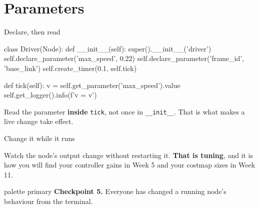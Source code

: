 \documentclass[aspectratio=169]{beamer}
\begin{document}
\section{Parameters}

\begin{frame}[fragile]{Declare, then read}
  \begin{pycodes}
class Driver(Node):
    def __init__(self):
        super().__init__('driver')
        self.declare_parameter('max_speed', 0.22)
        self.declare_parameter('frame_id', 'base_link')
        self.create_timer(0.1, self.tick)

    def tick(self):
        v = self.get_parameter('max_speed').value
        self.get_logger().info(f'v = {v}')
  \end{pycodes}

  \vspace{0.4em}
  \small
  Read the parameter \textbf{inside} \texttt{tick}, not once in \texttt{\_\_init\_\_}. That is
  what makes a live change take effect.
\end{frame}

\begin{frame}[fragile]{Change it while it runs}

  \vspace{0.4em}
  \small
  Watch the node's output change without restarting it. \textbf{That is tuning}, and it is how
  you will find your controller gains in Week 5 and your costmap sizes in Week 11.

  \vspace{0.3em}
  \centering
  \begin{beamercolorbox}[sep=5pt,center,rounded=true]{palette primary}
    \footnotesize \textbf{Checkpoint 5.} Everyone has changed a running node's behaviour from the terminal.
  \end{beamercolorbox}
\end{frame}
\end{document}
